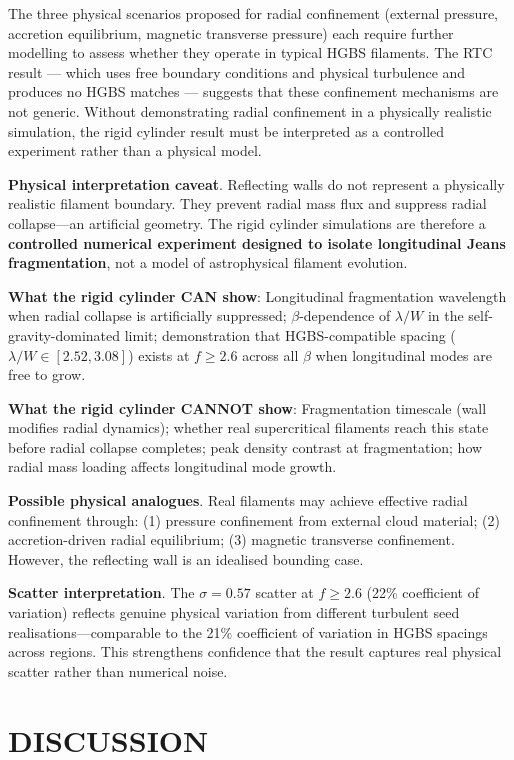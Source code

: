 \documentclass[twocolumn,longtitle,usenatbib]{mnras}
\begin{document}
The three physical scenarios proposed for radial confinement (external pressure, accretion equilibrium, magnetic transverse pressure) each require further modelling to assess whether they operate in typical HGBS filaments. The RTC result --- which uses free boundary conditions and physical turbulence and produces no HGBS matches --- suggests that these confinement mechanisms are not generic. Without demonstrating radial confinement in a physically realistic simulation, the rigid cylinder result must be interpreted as a controlled experiment rather than a physical model.

\textbf{Physical interpretation caveat}. Reflecting walls do not represent a physically realistic filament boundary. They prevent radial mass flux and suppress radial collapse---an artificial geometry. The rigid cylinder simulations are therefore a \textbf{controlled numerical experiment designed to isolate longitudinal Jeans fragmentation}, not a model of astrophysical filament evolution.

\textbf{What the rigid cylinder CAN show}: Longitudinal fragmentation wavelength when radial collapse is artificially suppressed; $\beta$-dependence of $\lambda/W$ in the self-gravity-dominated limit; demonstration that HGBS-compatible spacing ($\lambda/W \in [2.52, 3.08]$) exists at $f \geq 2.6$ across all $\beta$ when longitudinal modes are free to grow.

\textbf{What the rigid cylinder CANNOT show}: Fragmentation timescale (wall modifies radial dynamics); whether real supercritical filaments reach this state before radial collapse completes; peak density contrast at fragmentation; how radial mass loading affects longitudinal mode growth.

\textbf{Possible physical analogues}. Real filaments may achieve effective radial confinement through: (1) pressure confinement from external cloud material; (2) accretion-driven radial equilibrium; (3) magnetic transverse confinement. However, the reflecting wall is an idealised bounding case.

\textbf{Scatter interpretation}. The $\sigma = 0.57$ scatter at $f \geq 2.6$ (22\% coefficient of variation) reflects genuine physical variation from different turbulent seed realisations—comparable to the 21\% coefficient of variation in HGBS spacings across regions. This strengthens confidence that the result captures real physical scatter rather than numerical noise.

\section{DISCUSSION}
\end{document}

